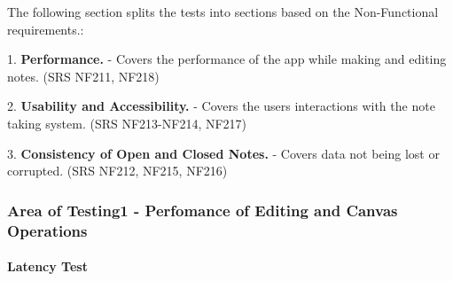 \documentclass[12pt, titlepage]{article}
\begin{document}




The following section splits the tests into sections based on the Non-Functional requirements.:

1. \textbf{Performance.}  - Covers the performance of the app while making and editing notes. (SRS NF211, NF218)

2. \textbf{Usability and Accessibility.} - Covers the users interactions with the note taking system. (SRS NF213-NF214, NF217)

3. \textbf{Consistency of Open and Closed Notes.} - Covers data not being lost or corrupted.  (SRS NF212, NF215, NF216)



\subsubsection{Area of Testing1 - Perfomance of Editing and Canvas Operations}

\paragraph{Latency Test}
\end{document}
